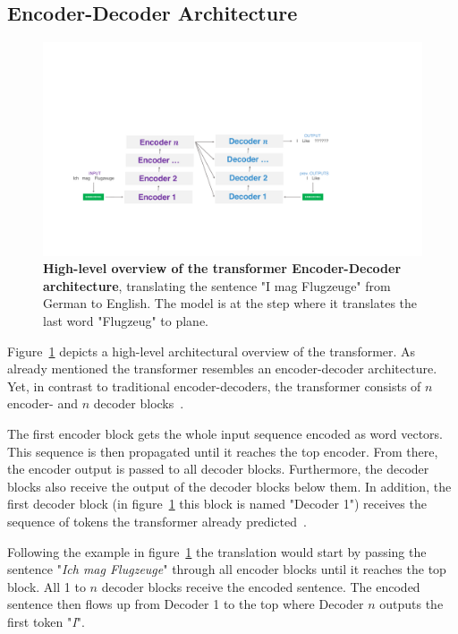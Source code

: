 \subsection{Encoder-Decoder Architecture}

\begin{figure}[htp]
    \centering
    \includegraphics[width=\textwidth]{figures/03_theory/03_transformer_Architecture_HighLevel}
    \caption{\textbf{High-level overview of the transformer Encoder-Decoder architecture}, translating the sentence "I mag Flugzeuge" from German to English. The model is at the step where it translates the last word "Flugzeug" to plane.}
    \label{fig:03_transformer_HighlevelOverview}
\end{figure}

Figure~\ref{fig:03_transformer_HighlevelOverview} depicts a high-level architectural overview of the transformer. As already mentioned the transformer resembles an encoder-decoder architecture. Yet, in contrast to traditional encoder-decoders, the transformer consists of $n$ encoder- and $n$ decoder blocks~\cite{Vaswani2017d}. 
\medskip

The first encoder block gets the whole input sequence encoded as word vectors. This sequence is then propagated until it reaches the top encoder. From there, the encoder output is passed to all decoder blocks. Furthermore, the decoder blocks also receive the output of the decoder blocks below them. In addition, the first decoder block {(in figure~\ref{fig:03_transformer_HighlevelOverview} this block is named "Decoder 1")} receives the sequence of tokens the transformer already predicted~\cite{Vaswani2017d}. 
\medskip

Following the example in figure~\ref{fig:03_transformer_HighlevelOverview} the translation would start by passing the sentence "\textit{Ich mag Flugzeuge}" through all encoder blocks until it reaches the top block. All 1 to $n$ decoder blocks receive the encoded sentence. The encoded sentence then flows up from Decoder 1 to the top where Decoder $n$ outputs the first token "\textit{I}".

